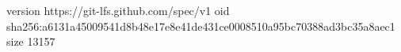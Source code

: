 version https://git-lfs.github.com/spec/v1
oid sha256:a6131a45009541d8b48e17e8e41de431ce0008510a95bc70388ad3bc35a8aec1
size 13157
